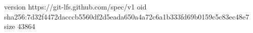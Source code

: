 version https://git-lfs.github.com/spec/v1
oid sha256:7d32f4472dacccb5560df2d5eada650a4a72c6a1b333fd69b0159c5c83ec48e7
size 43864

